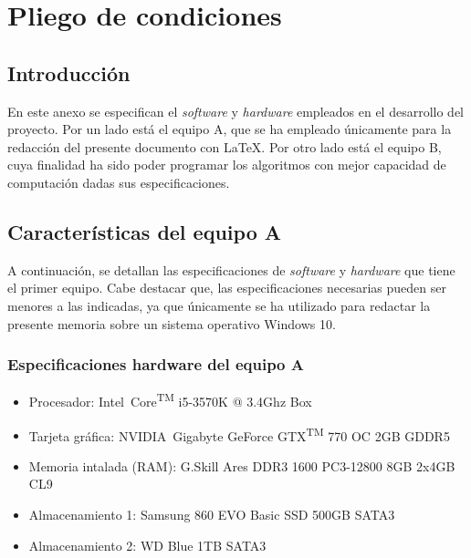 \chapter{Pliego de condiciones}
\label{cha:pliego-de-condiciones}

\section{Introducción}
\label{sec:intro-pliego}

En este anexo se especifican el \textit{software} y \textit{hardware} empleados en el desarrollo del proyecto. Por un lado está el equipo A, que se ha empleado únicamente para la redacción del presente documento con \LaTeX. Por otro lado está el equipo B, cuya finalidad ha sido poder programar los algoritmos con mejor capacidad de computación dadas sus especificaciones.

\section{Características del equipo A}
\label{sec:caracteristicas-equipoa}

A continuación, se detallan las especificaciones de \textit{software} y \textit{hardware} que tiene el primer equipo. Cabe destacar que, las especificaciones necesarias pueden ser menores a las indicadas, ya que únicamente se ha utilizado para redactar la presente memoria sobre un sistema operativo Windows 10.

\subsection{Especificaciones hardware del equipo A}
\label{subsec:especificaciones-hardware-equipoa}
\begin{itemize}
    \item Procesador: Intel\textregistered\ Core\textsuperscript{TM} i5-3570K @ 3.4Ghz Box
    \item Tarjeta gráfica: NVIDIA\textregistered\ Gigabyte GeForce GTX\textsuperscript{TM} 770 OC 2GB GDDR5
    \item Memoria intalada (RAM): G.Skill Ares DDR3 1600 PC3-12800 8GB 2x4GB CL9
    \item Almacenamiento 1: Samsung 860 EVO Basic SSD 500GB SATA3
    \item Almacenamiento 2: WD Blue 1TB SATA3
\end{itemize}

